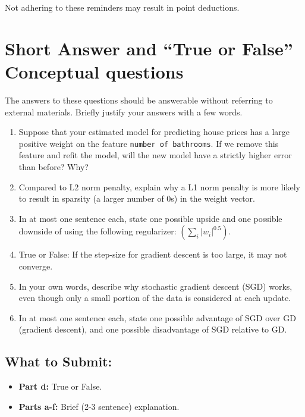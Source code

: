 \documentclass{article}
\begin{document}
Not adhering to these reminders may result in point deductions. \\



\clearpage{}



\section*{Short Answer and ``True or False'' Conceptual questions}

\begin{aprob}
    The answers to these questions should be answerable without referring to external materials.  Briefly justify your answers with a few words.
    \begin{enumerate}
      \item {} Suppose that your estimated model for predicting house prices has a large positive weight on the feature \texttt{number of bathrooms}. If we remove this feature and refit the model, will the new model have a strictly higher error than before? Why?
      \item {} Compared to L2 norm penalty, explain why a L1 norm penalty is more likely to result in sparsity (a larger number of 0s) in the weight vector.
      \item {} In at most one sentence each, state one possible upside and one possible downside of using the following regularizer: $\left(\sum_{i}\left|w_{i}\right|^{0.5}\right)$.
      \item {} True or False: If the step-size for gradient descent is too large, it may not converge.
      \item {} In your own words, describe why stochastic gradient descent (SGD) works, even though only a small portion of the data is considered at each update.
      \item {} In at most one sentence each, state one possible advantage of SGD over GD (gradient descent), and one possible disadvantage of SGD relative to GD.
    \end{enumerate}
    
    \subsection*{What to Submit:}
    \begin{itemize}
        \item \textbf{Part d:} True or False. 
        \item \textbf{Parts a-f:} Brief (2-3 sentence) explanation.
    \end{itemize}
\end{aprob}
\end{document}
